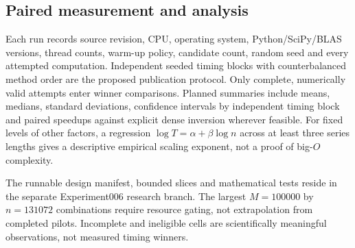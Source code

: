 \subsection{Paired measurement and analysis}
Each run records source revision, CPU, operating system, Python/SciPy/BLAS versions, thread counts, warm-up policy, candidate count, random seed and every attempted computation. Independent seeded timing blocks with counterbalanced method order are the proposed publication protocol. Only complete, numerically valid attempts enter winner comparisons. Planned summaries include means, medians, standard deviations, confidence intervals by independent timing block and paired speedups against explicit dense inversion wherever feasible. For fixed levels of other factors, a regression $\log T=\alpha+\beta\log n$ across at least three series lengths gives a descriptive empirical scaling exponent, not a proof of big-$O$ complexity.

The runnable design manifest, bounded slices and mathematical tests reside in the separate Experiment006 research branch. The largest $M=100000$ by $n=131072$ combinations require resource gating, not extrapolation from completed pilots. Incomplete and ineligible cells are scientifically meaningful observations, not measured timing winners.
